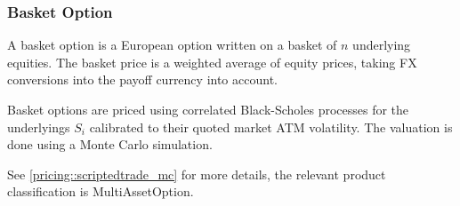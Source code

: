 \subsubsection{Basket Option}
\label{pricing::basektoption}

A basket option is a European option written on a basket of
$n$ underlying equities. The basket price is a weighted average of equity
prices, taking FX conversions into the payoff currency into account. 

Basket options are priced using correlated Black-Scholes processes for
the underlyings $S_i$ calibrated to their quoted market ATM
volatility. The valuation is done using a Monte Carlo simulation.

See \ref{pricing::scriptedtrade_mc} for more details, the relevant product classification is MultiAssetOption.